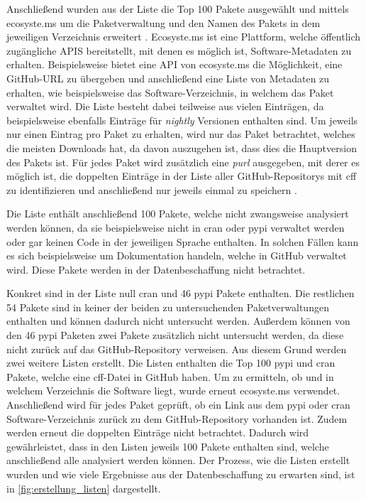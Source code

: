Anschließend wurden aus der Liste die Top 100 Pakete ausgewählt und mittels ecosyste.ms um die Paketverwaltung und den Namen des Pakets in dem jeweiligen Verzeichnis erweitert \autocite{nesbitt_ecosystems_nodate}.
Ecosyste.ms ist eine Plattform, welche öffentlich zugängliche APIS bereitstellt, mit denen es möglich ist, Software-Metadaten zu erhalten.
Beispielsweise bietet eine API von ecosyste.ms die Möglichkeit, eine GitHub-URL zu übergeben und anschließend eine Liste von Metadaten zu erhalten, wie beispielsweise das Software-Verzeichnis, in welchem das Paket verwaltet wird.
Die Liste besteht dabei teilweise aus vielen Einträgen, da beispielsweise ebenfalls Einträge für \emph{nightly} Versionen enthalten sind.
Um jeweils nur einen Eintrag pro Paket zu erhalten, wird nur das Paket betrachtet, welches die meisten Downloads hat, da davon auszugehen ist, dass dies die Hauptversion des Pakets ist.
Für jedes Paket wird zusätzlich eine \emph{purl} ausgegeben, mit derer es möglich ist, die doppelten Einträge in der Liste aller GitHub-Repositorys mit \gls{cff} zu identifizieren und anschließend nur jeweils einmal zu speichern \autocites{noauthor_package-urlpurl-spec_2024}{nesbitt_ecosystems_nodate}.

Die Liste enthält anschließend 100 Pakete, welche nicht zwangsweise analysiert werden können, da sie beispielsweise nicht in \gls{cran} oder \gls{pypi} verwaltet werden oder gar keinen Code in der jeweiligen Sprache enthalten.
In solchen Fällen kann es sich beispielsweise um Dokumentation handeln, welche in GitHub verwaltet wird.
Diese Pakete werden in der Datenbeschaffung nicht betrachtet.

Konkret sind in der Liste null \gls{cran} und 46 \gls{pypi} Pakete enthalten.
Die restlichen 54 Pakete sind in keiner der beiden zu untersuchenden Paketverwaltungen enthalten und können dadurch nicht untersucht werden.
Außerdem können von den 46 \gls{pypi} Paketen zwei Pakete zusätzlich nicht untersucht werden, da diese nicht zurück auf das GitHub-Repository verweisen.
Aus diesem Grund werden zwei weitere Listen erstellt.
Die Listen enthalten die Top 100 \gls{pypi} und \gls{cran} Pakete, welche eine \gls{cff}-Datei in GitHub haben.
Um zu ermitteln, ob und in welchem Verzeichnis die Software liegt, wurde erneut ecosyste.ms verwendet.
Anschließend wird für jedes Paket geprüft, ob ein Link aus dem \gls{pypi} oder \gls{cran} Software-Verzeichnis zurück zu dem GitHub-Repository vorhanden ist.
Zudem werden erneut die doppelten Einträge nicht betrachtet.
Dadurch wird gewährleistet, dass in den Listen jeweils 100 Pakete enthalten sind, welche anschließend alle analysiert werden können.
Der Prozess, wie die Listen erstellt wurden und wie viele Ergebnisse aus der Datenbeschaffung zu erwarten sind, ist in \autoref{fig:erstellung_listen} dargestellt.

